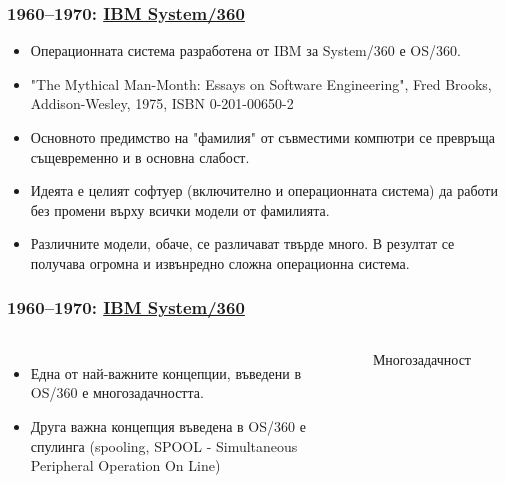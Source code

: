 \documentclass[ignorenonframetext, hyperref=unicode]{beamer}
\begin{document}
\begin{frame}
\frametitle{1960--1970: \href{http://en.wikipedia.org/wiki/System/360}{IBM System/360}}
\begin{itemize}
  \item Операционната система разработена от IBM за System/360 е OS/360.
  \item "The Mythical Man-Month: Essays on Software Engineering", Fred Brooks,
  Addison-Wesley, 1975, ISBN 0-201-00650-2
  \item Основното предимство на "фамилия" от съвместими компютри се превръща
  същевременно и в основна слабост.
  \item Идеята е целият софтуер (включително и операционната система) да работи
  без промени върху всички модели от фамилията. 
  \item Различните модели, обаче, се различават твърде много. В резултат се
  получава огромна и извънредно сложна операционна система.
\end{itemize}
\end{frame}
\item 
  
\begin{frame}
\frametitle{1960--1970: \href{http://en.wikipedia.org/wiki/System/360}{IBM
System/360}} 
\begin{columns}
\begin{itemize}
  \item Една от най-важните концепции, въведени в OS/360 е многозадачността.
  \item Друга важна концепция въведена в OS/360 е спулинга (spooling, SPOOL -
  Simultaneous Peripheral Operation On Line) 
\end{itemize}
\begin{figure}
\center
{}
\caption{Многозадачност}
\end{figure}
\end{columns}
\end{frame}
\end{document}
